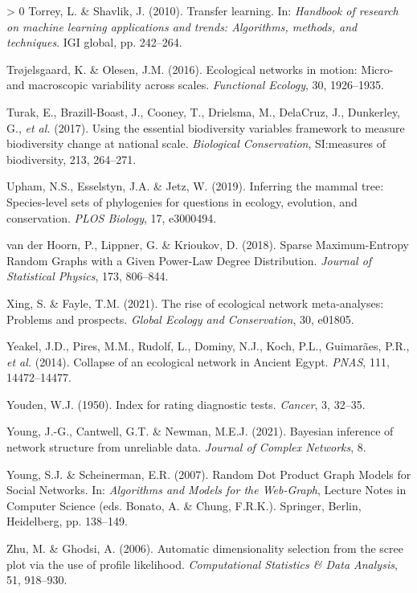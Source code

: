 \documentclass[11pt]{article}
\newlength{\cslhangindent}
\newenvironment{CSLReferences}[3] %
 {%
  \setlength{\parindent}{0pt}
  \ifodd #1 \everypar{\setlength{\hangindent}{\cslhangindent}}\ignorespaces\fi
  \ifnum #2 > 0
  \setlength{\parskip}{#2\baselineskip}
  \fi
 }%
 {}
\begin{document}
\begin{CSLReferences}{1}{0}
\leavevmode\hypertarget{ref-Torrey2010TraLea}{}%
Torrey, L. \& Shavlik, J. (2010). Transfer learning. In: \emph{Handbook
of research on machine learning applications and trends: Algorithms,
methods, and techniques}. IGI global, pp. 242--264.

\leavevmode\hypertarget{ref-Trojelsgaard2016EcoNet}{}%
Trøjelsgaard, K. \& Olesen, J.M. (2016). Ecological networks in motion:
Micro- and macroscopic variability across scales. \emph{Functional
Ecology}, 30, 1926--1935.

\leavevmode\hypertarget{ref-Turak2017UsiEss}{}%
Turak, E., Brazill-Boast, J., Cooney, T., Drielsma, M., DelaCruz, J.,
Dunkerley, G., \emph{et al.} (2017). Using the essential biodiversity
variables framework to measure biodiversity change at national scale.
\emph{Biological Conservation}, SI:measures of biodiversity, 213,
264--271.

\leavevmode\hypertarget{ref-Upham2019InfMam}{}%
Upham, N.S., Esselstyn, J.A. \& Jetz, W. (2019). Inferring the mammal
tree: Species-level sets of phylogenies for questions in ecology,
evolution, and conservation. \emph{PLOS Biology}, 17, e3000494.

\leavevmode\hypertarget{ref-vanderHoorn2018SpaMax}{}%
van der Hoorn, P., Lippner, G. \& Krioukov, D. (2018). Sparse
Maximum-Entropy Random Graphs with a Given Power-Law Degree
Distribution. \emph{Journal of Statistical Physics}, 173, 806--844.

\leavevmode\hypertarget{ref-Xing2021RisEco}{}%
Xing, S. \& Fayle, T.M. (2021). The rise of ecological network
meta-analyses: Problems and prospects. \emph{Global Ecology and
Conservation}, 30, e01805.

\leavevmode\hypertarget{ref-Yeakel2014ColEco}{}%
Yeakel, J.D., Pires, M.M., Rudolf, L., Dominy, N.J., Koch, P.L.,
Guimarães, P.R., \emph{et al.} (2014). Collapse of an ecological network
in Ancient Egypt. \emph{PNAS}, 111, 14472--14477.

\leavevmode\hypertarget{ref-Youden1950IndRat}{}%
Youden, W.J. (1950). Index for rating diagnostic tests. \emph{Cancer},
3, 32--35.

\leavevmode\hypertarget{ref-Young2021BayInf}{}%
Young, J.-G., Cantwell, G.T. \& Newman, M.E.J. (2021). Bayesian
inference of network structure from unreliable data. \emph{Journal of
Complex Networks}, 8.

\leavevmode\hypertarget{ref-Young2007RanDot}{}%
Young, S.J. \& Scheinerman, E.R. (2007). Random Dot Product Graph Models
for Social Networks. In: \emph{Algorithms and Models for the Web-Graph},
Lecture Notes in Computer Science (eds. Bonato, A. \& Chung, F.R.K.).
Springer, Berlin, Heidelberg, pp. 138--149.

\leavevmode\hypertarget{ref-Zhu2006AutDim}{}%
Zhu, M. \& Ghodsi, A. (2006). Automatic dimensionality selection from
the scree plot via the use of profile likelihood. \emph{Computational
Statistics \& Data Analysis}, 51, 918--930.

\end{CSLReferences}
\end{document}
